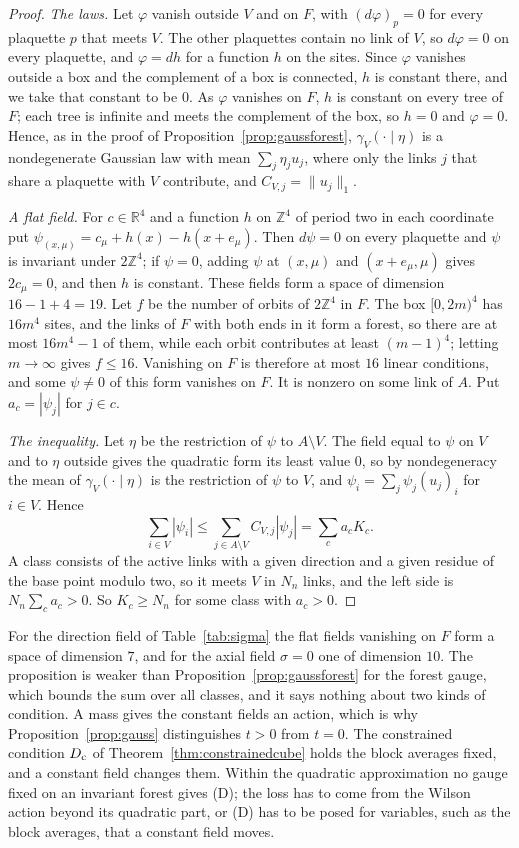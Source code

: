 \documentclass[11pt]{amsart}
\theoremstyle{definition}
\theoremstyle{remark}
\numberwithin{equation}{section}
\newcommand{\R}{\mathbb{R}}
\newcommand{\Z}{\mathbb{Z}}
\begin{document}
\begin{proof}
\emph{The laws.} Let $\varphi$ vanish outside $V$ and on $F$, with
$(d\varphi)_p=0$ for every plaquette $p$ that meets $V$. The other plaquettes
contain no link of $V$, so $d\varphi=0$ on every plaquette, and
$\varphi=dh$ for a function $h$ on the sites. Since $\varphi$ vanishes
outside a box and the complement of a box is connected, $h$ is constant
there, and we take that constant to be $0$. As $\varphi$ vanishes on $F$, $h$
is constant on every tree of $F$; each tree is infinite and meets the
complement of the box, so $h=0$ and $\varphi=0$. Hence, as in the proof of
Proposition~\ref{prop:gaussforest}, $\gamma_V(\cdot\mid\eta)$ is a
nondegenerate Gaussian law with mean $\sum_j\eta_ju_j$, where only the links
$j$ that share a plaquette with $V$ contribute, and $C_{V,j}=\|u_j\|_1$.

\emph{A flat field.} For $c\in\R^4$ and a function $h$ on $\Z^4$ of period
two in each coordinate put $\psi_{(x,\mu)}=c_\mu+h(x)-h(x+e_\mu)$. Then
$d\psi=0$ on every plaquette and $\psi$ is invariant under $2\Z^4$; if
$\psi=0$, adding $\psi$ at $(x,\mu)$ and $(x+e_\mu,\mu)$ gives $2c_\mu=0$,
and then $h$ is constant. These fields form a space of dimension
$16-1+4=19$. Let $f$ be the number of orbits of $2\Z^4$ in $F$. The box
$[0,2m)^4$ has $16m^4$ sites, and the links of $F$ with both ends in it form
a forest, so there are at most $16m^4-1$ of them, while each orbit
contributes at least $(m-1)^4$; letting $m\to\infty$ gives $f\le16$. Vanishing
on $F$ is therefore at most $16$ linear conditions, and some $\psi\ne0$ of
this form vanishes on $F$. It is nonzero on some link of $A$. Put
$a_c=|\psi_j|$ for $j\in c$.

\emph{The inequality.} Let $\eta$ be the restriction of $\psi$ to
$A\setminus V$. The field equal to $\psi$ on $V$ and to $\eta$ outside gives
the quadratic form its least value $0$, so by nondegeneracy the mean of
$\gamma_V(\cdot\mid\eta)$ is the restriction of $\psi$ to $V$, and
$\psi_i=\sum_j\psi_j(u_j)_i$ for $i\in V$. Hence
\[
\sum_{i\in V}|\psi_i|\le\sum_{j\in A\setminus V}C_{V,j}|\psi_j|=\sum_ca_cK_c .
\]
A class consists of the active links with a given direction and a given
residue of the base point modulo two, so it meets $V$ in $N_n$ links, and
the left side is $N_n\sum_ca_c>0$. So $K_c\ge N_n$ for some class with
$a_c>0$.
\end{proof}

For the direction field of Table~\ref{tab:sigma} the flat fields vanishing
on $F$ form a space of dimension $7$, and for the axial field $\sigma=0$ one
of dimension $10$. The proposition is weaker than
Proposition~\ref{prop:gaussforest} for the forest gauge, which bounds the
sum over all classes, and it says nothing about two kinds of condition. A
mass gives the constant fields an action, which is why
Proposition~\ref{prop:gauss} distinguishes $t>0$ from $t=0$. The constrained
condition $D_{\rm c}$ of Theorem~\ref{thm:constrainedcube} holds the block
averages fixed, and a constant field changes them. Within the quadratic
approximation no gauge fixed on an invariant forest gives (D); the loss has
to come from the Wilson action beyond its quadratic part, or (D) has to be
posed for variables, such as the block averages, that a constant field
moves.
\end{document}

